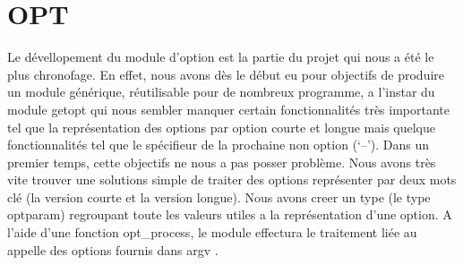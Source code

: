 \documentclass[12pt]{article}
\begin{document}

    \section{OPT}
    Le dévellopement du module d'option est la partie du projet qui nous a été 
    le plus chronofage. En effet, nous avons dès le début eu pour objectifs de 
    produire un module générique, réutilisable pour de nombreux programme, a 
    l'instar du module getopt qui nous sembler manquer certain fonctionnalités
    très importante tel que la représentation des options par option courte et 
    longue mais quelque fonctionnalités tel que le spécifieur de la prochaine 
    non option (`--').
    Dans un premier temps, cette objectifs ne nous a pas posser problème. Nous 
    avons très vite trouver une solutions simple de traiter des options 
    représenter par deux mots clé (la version courte et la version longue). Nous 
    avons creer un type (le type optparam) regroupant toute les valeurs utiles 
    a la représentation d'une option. A l'aide d'une fonction opt\_process, le 
    module effectura le traitement liée au appelle des options fournis dans argv
    .
\end{document}
